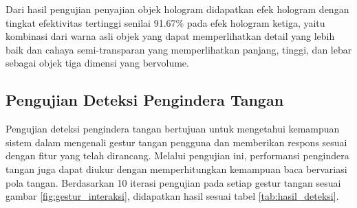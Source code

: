 \documentclass[conference]{IEEEtran}
\begin{document}
		Dari hasil pengujian penyajian objek hologram didapatkan efek hologram dengan tingkat efektivitas tertinggi senilai 91.67\% pada efek hologram ketiga, yaitu kombinasi dari warna asli objek yang dapat memperlihatkan detail yang lebih baik dan cahaya semi-transparan yang memperlihatkan panjang, tinggi, dan lebar sebagai objek tiga dimensi yang bervolume.
		
	\subsection{Pengujian Deteksi Pengindera Tangan} 
		Pengujian deteksi pengindera tangan bertujuan untuk mengetahui kemampuan sistem dalam mengenali gestur tangan pengguna dan memberikan respons sesuai dengan fitur yang telah dirancang. Melalui pengujian ini, performansi pengindera tangan juga dapat diukur dengan memperhitungkan kemampuan baca bervariasi pola tangan. Berdasarkan 10 iterasi pengujian pada setiap gestur tangan sesuai gambar \ref{fig:gestur_interaksi}, didapatkan hasil sesuai tabel \ref{tab:hasil_deteksi}.
		
\end{document}
